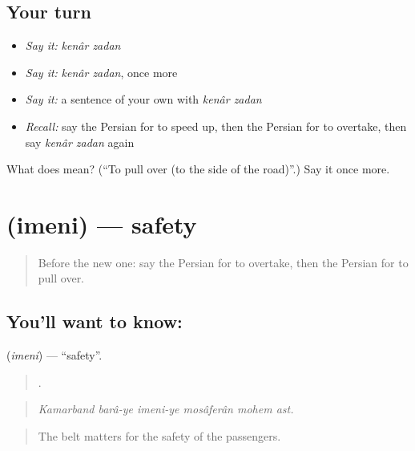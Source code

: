 \subsection*{Your turn}
\begin{itemize}
\raggedright
  \item \emph{Say it:} \emph{kenâr zadan}
  \item \emph{Say it:} \emph{kenâr zadan}, once more
  \item \emph{Say it:} a sentence of your own with \emph{kenâr zadan}
  \item \emph{Recall:} say the Persian for to speed up, then the Persian for to overtake, then say \emph{kenâr zadan} again
\end{itemize}

\begin{tcolorbox}[breakable,colback=teal!4,colframe=teal!35!black,title={Before you move on}]
What does   mean? (\textquotedblleft{}To pull over (to the side of the road)\textquotedblright{}.) Say it once more.
\end{tcolorbox}
\section[\texorpdfstring{\fa{ایمنی} (imeni)}{ایمنی (imeni)}]{ (imeni) — safety}

\label{lesson:FA-C424-imeni}



\begin{quote}
Before the new one: say the Persian for to overtake, then the Persian for to pull over.
\end{quote}

\subsection*{You'll want to know: }
\textbf{} (\emph{imeni}) — \textquotedblleft{}safety\textquotedblright{}.

\begin{quote}
     .
\end{quote}

\begin{quote}
\emph{Kamarband barâ-ye imeni-ye mosâferân mohem ast.}
\end{quote}

\begin{quote}
The belt matters for the safety of the passengers.
\end{quote}

